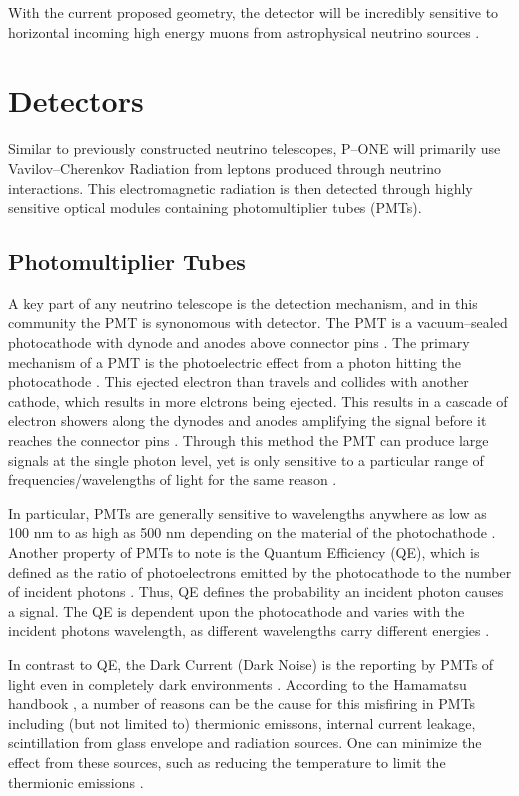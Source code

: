 With the current proposed geometry, the detector will be incredibly sensitive to horizontal incoming high energy muons from astrophysical neutrino sources \cite{pone}. 

\section{Detectors}
Similar to previously constructed neutrino telescopes, P--ONE will primarily use Vavilov--Cherenkov Radiation from leptons produced through neutrino interactions. This electromagnetic radiation is then detected through highly sensitive optical modules containing photomultiplier tubes (PMTs).

\subsection{Photomultiplier Tubes}

A key part of any neutrino telescope is the detection mechanism, and in this community the PMT is synonomous with detector. The PMT is a vacuum--sealed photocathode with dynode and anodes above connector pins \cite{ham}. The primary mechanism of a PMT is the photoelectric effect from a photon hitting the photocathode \cite{pmt_hist}. This ejected electron than travels and collides with another cathode, which results in more elctrons being ejected. This results in a cascade of electron showers along the dynodes and anodes amplifying the signal before it reaches the connector pins \cite{pmt_hist}. Through this method the PMT can produce large signals at the single photon level, yet is only sensitive to a particular range of frequencies/wavelengths of light for the same reason \cite{pmt_hist}.

In particular, PMTs are generally sensitive to wavelengths anywhere as low as 100 nm to as high as 500 nm depending on the material of the photochathode \cite{ham}. Another property of PMTs to note is the Quantum Efficiency (QE), which is defined as the ratio of photoelectrons emitted by the photocathode to the number of incident photons \cite{ham}. Thus, QE defines the probability an incident photon causes a signal. The QE is dependent upon the photocathode and varies with the incident photons wavelength, as different wavelengths carry different energies \cite{ham}.

In contrast to QE, the Dark Current (Dark Noise) is the reporting by PMTs of light even in completely dark environments \cite{ham}. According to the Hamamatsu handbook \cite{ham}, a number of reasons can be the cause for this misfiring in PMTs including (but not limited to) thermionic emissons, internal current leakage, scintillation from glass envelope and radiation sources. One can minimize the effect from these sources, such as reducing the temperature to limit the thermionic emissions \cite{ham}.

